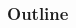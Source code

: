 \placelogotrue
\begin{frame}
  \frametitle{Outline}
  \begin{columns}[c]
    \begin{column}{0.5\textwidth}
      \tableofcontents[sections=1]
      \vspace{0.5cm}
      \tableofcontents[sections=2]
    \end{column}
    \begin{column}{0.5\textwidth}
      \tableofcontents[sections=3]
    \end{column}
  \end{columns}
\end{frame}
\placelogofalse
